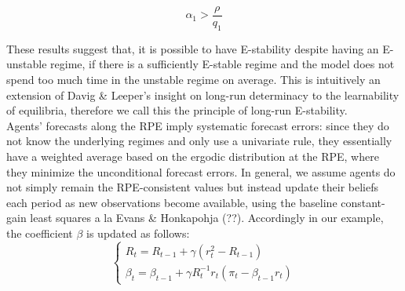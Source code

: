 \documentclass[12pt,reqno]{article}
\numberwithin{equation}{section}
\begin{document}
$$ \alpha_1 > \frac{\rho}{q_1} $$

These results suggest that, it is possible to have E-stability despite having an E-unstable regime, if there is a sufficiently E-stable regime and the model does not spend too much time in the unstable regime on average. This is intuitively an extension of Davig \& Leeper's insight on long-run determinacy to the learnability of equilibria, therefore we call this the principle of long-run E-stability. \\

Agents' forecasts along the RPE imply systematic forecast errors: since they do not know the underlying regimes and only use a univariate rule, they essentially have a weighted average based on the ergodic distribution at the RPE, where they minimize the unconditional forecast errors. In general, we assume agents do not simply remain the RPE-consistent values but instead update their beliefs each period as new observations become available, using the baseline constant-gain least squares a la Evans \& Honkapohja (??). Accordingly in our example, the coefficient $\beta$ is updated as follows: \\

$$
\begin{cases}

R_t = R_{t-1} + \gamma (r_t^2 - R_{t-1} ) \\
\beta_t = \beta_{t-1} + \gamma R_t^{-1} r_t (\pi_t - \beta_{t-1} r_t) 
\end{cases}
$$
\end{document}
